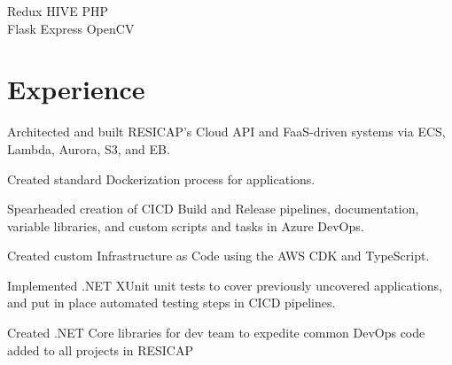 \documentclass[]{deedy-resume-openfont}
\begin{document}
\begin{minipage}[t]{0.33\textwidth}
Redux \textbullet{} HIVE  \textbullet{} PHP \\
Flask \textbullet{} Express \textbullet{} OpenCV \\


\sectionsep

%
%

\end{minipage} 
\hfill
\begin{minipage}[t]{0.66\textwidth} 


\section{Experience}

\vspace{\topsep} %
\begin{tightemize}
\item Architected and built RESICAP's Cloud API and FaaS-driven systems via ECS, Lambda, Aurora, S3, and EB.
\item Created standard Dockerization process for applications.
\item Spearheaded creation of CICD Build and Release pipelines, documentation, variable libraries, and custom scripts and tasks in Azure DevOps.
\item Created custom Infrastructure as Code using the AWS CDK and TypeScript.
\item Implemented .NET XUnit unit tests to cover previously uncovered applications, and put in place automated testing steps in CICD pipelines.
\item Created .NET Core libraries for dev team to expedite common DevOps code added to all projects in RESICAP
\end{tightemize}

\sectionsep


\end{minipage}
\end{document}
